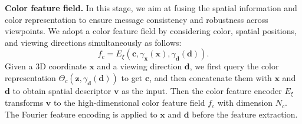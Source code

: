 \documentclass[10pt,twocolumn,letterpaper]{article}
\begin{document}

\noindent\textbf{Color feature field.} In this stage, we aim at fusing the spatial information and color representation to ensure message consistency and robustness across viewpoints.  We adopt a color feature field by considering color, spatial positions, and viewing directions simultaneously as follows:
\begin{equation}
f_c=E_\xi(\mathbf{c},\gamma_{\mathbf{x}}(\mathbf{x}),\gamma_{\mathbf{d}}(\mathbf{d})).
\label{eq:colorrepresentation}
\end{equation}
%
Given a 3D coordinate $\mathbf{x}$ and a viewing direction $\mathbf{d}$, we first query the color representation $\Theta_{c}\left(\mathbf{z}, \gamma_{\mathbf{d}}(\mathbf{d})\right)$ to get $\mathbf{c}$, and then concatenate them with $\mathbf{x}$ and $\mathbf{d}$ to obtain spatial descriptor $\mathbf{v}$ as the input. Then the color feature encoder $E_{\xi}$ transforms $\mathbf{v}$ to the high-dimensional color feature field $f_c$ with dimension $N_c$. The Fourier feature encoding is applied to $\mathbf{x}$ and $\mathbf{d}$ before the feature extraction.

\end{document}
